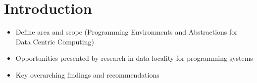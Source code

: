 \chapter{Introduction}
\label{ch:intro}
\begin{itemize}
\item Define area and scope (Programming Environments and Abstractions for Data Centric Computing)
\item Opportunities presented by research in data locality for programming systems
\item Key overarching findings and recommendations
\end{itemize}
